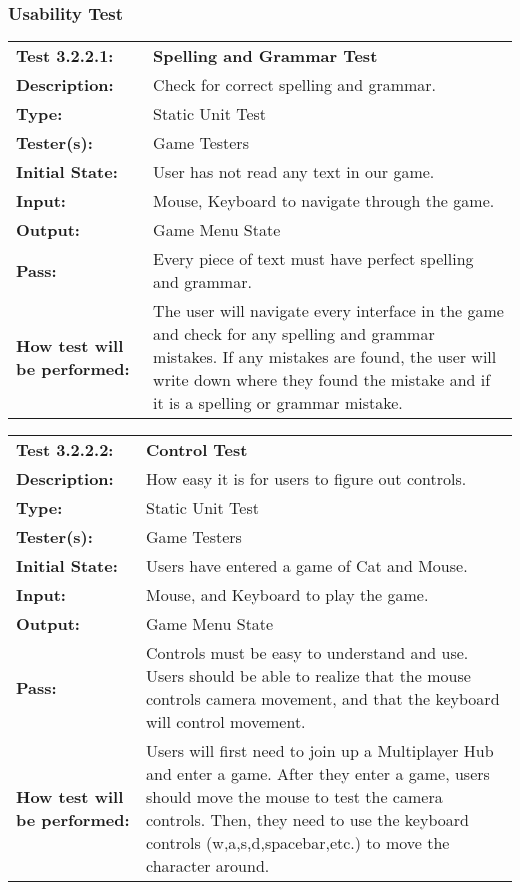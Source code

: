 \documentclass[12pt, titlepage]{article}
\begin{document}
\subsubsection{Usability Test}
\begin{mdframed}[linewidth=1pt]
\begin{tabularx}{\textwidth}{@{}p{3cm}X@{}}
{\bf Test 3.2.2.1:} & {\bf Spelling and Grammar Test}\\[\baselineskip]
{\bf Description:} & Check for correct spelling and grammar.\\[0.5\baselineskip]
{\bf Type:} & Static Unit Test\\[0.5\baselineskip]
{\bf Tester(s):} & Game Testers\\[0.5\baselineskip]
{\bf Initial State:} & User has not read any text in our game.\\[0.5\baselineskip]
{\bf Input:} & Mouse, Keyboard to navigate through the game.\\[0.5\baselineskip]
{\bf Output:} & Game Menu State\\[0.5\baselineskip]
{\bf Pass:} & Every piece of text must have perfect spelling and grammar.\\[0.5\baselineskip]
{\bf How test will be performed:} & The user will navigate every interface in the game and check for any spelling and grammar mistakes. If any mistakes are found, the user will write down where they found the mistake and if it is a spelling or grammar mistake. 
\end{tabularx}
\end{mdframed}

\begin{mdframed}[linewidth=1pt]
\begin{tabularx}{\textwidth}{@{}p{3cm}X@{}}
{\bf Test 3.2.2.2:} & {\bf Control Test}\\[\baselineskip]
{\bf Description:} & How easy it is for users to figure out controls.\\[0.5\baselineskip]
{\bf Type:} & Static Unit Test\\[0.5\baselineskip]
{\bf Tester(s):} & Game Testers\\[0.5\baselineskip]
{\bf Initial State:} & Users have entered a game of Cat and Mouse. \\[0.5\baselineskip]
{\bf Input:} & Mouse, and Keyboard to play the game.\\[0.5\baselineskip]
{\bf Output:} & Game Menu State\\[0.5\baselineskip]
{\bf Pass:} & Controls must be easy to understand and use. Users should be able to realize that the mouse controls camera movement, and that the keyboard will control movement.\\[0.5\baselineskip]
{\bf How test will be performed:} & Users will first need to join up a Multiplayer Hub and enter a game. After they enter a game, users should move the mouse to test the camera controls. Then, they need to use the keyboard controls (w,a,s,d,spacebar,etc.) to move the character around.
\end{tabularx}
\end{mdframed}				
\end{document}
